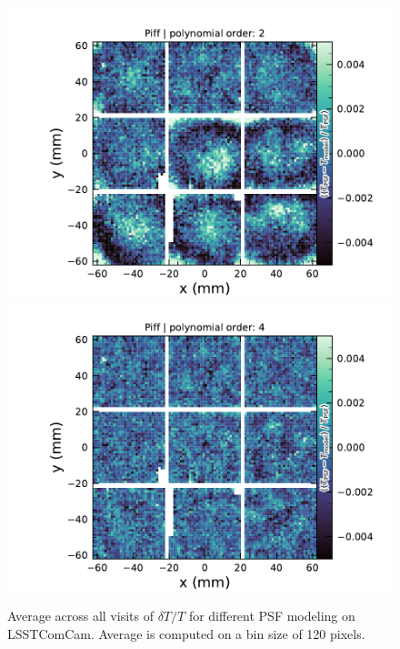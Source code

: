 \begin{figure}[htb!]
\centering
\includegraphics[scale=0.29]{figures/dT_T_Piff_poly_order_2.pdf}
\includegraphics[scale=0.29]{figures/dT_T_Piff_poly_order_4.pdf}
\caption{\small Average across all visits of $\delta T/T$  for different PSF modeling on \gls{LSSTComCam}. Average is computed on a bin size of 120 pixels.}
\label{fig:psf_residuals_fov}
\end{figure}

